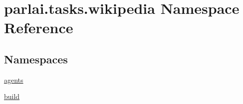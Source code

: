 \hypertarget{namespaceparlai_1_1tasks_1_1wikipedia}{}\section{parlai.\+tasks.\+wikipedia Namespace Reference}
\label{namespaceparlai_1_1tasks_1_1wikipedia}
\subsection*{Namespaces}
\begin{DoxyCompactItemize}
\item 
 \hyperlink{namespaceparlai_1_1tasks_1_1wikipedia_1_1agents}{agents}
\item 
 \hyperlink{namespaceparlai_1_1tasks_1_1wikipedia_1_1build}{build}
\end{DoxyCompactItemize}
